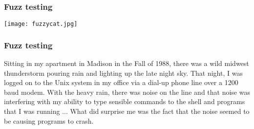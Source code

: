 \documentclass[10pt,xcolor={dvipsnames}]{beamer}
\begin{document}










\begin{frame}

\frametitle{Fuzz testing}

\begin{center}
\texttt{[image: fuzzycat.jpg]}
\end{center}

\end{frame}


\begin{frame}

\frametitle{Fuzz testing}

\begin{exampleblock}{}
\small
Sitting in my apartment in Madison in the Fall of 1988, there was a wild midwest thunderstorm pouring rain and lighting up the late night sky. That night, I was logged on to the Unix system in my office via a dial-up phone line over a 1200 baud modem. With the heavy rain, there was noise on the line and that noise was interfering with my ability to type sensible commands to the shell and programs that I was running ... What did surprise me was the fact that the noise seemed to be causing programs to crash.
\vskip3mm
  \hspace*{}
\end{exampleblock}

\end{frame}
\end{document}

